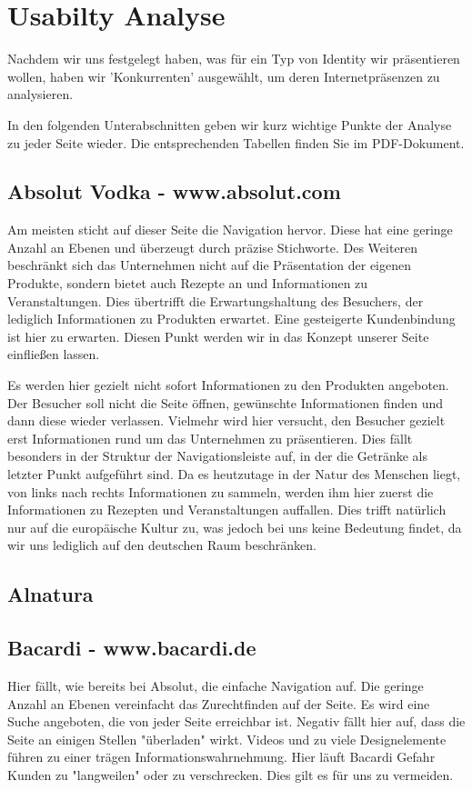 \documentclass[12pt,a4paper,oneside,ngerman]{article}
\begin{document}
\section{Usabilty Analyse} %
Nachdem wir uns festgelegt haben, was für ein Typ von Identity wir präsentieren wollen, haben wir 'Konkurrenten' ausgewählt, um deren Internetpräsenzen zu analysieren. 

In den folgenden Unterabschnitten geben wir kurz wichtige Punkte der Analyse zu jeder Seite wieder. Die entsprechenden Tabellen finden Sie im PDF-Dokument. %

\subsection{Absolut Vodka - www.absolut.com} %
Am meisten sticht auf dieser Seite die Navigation hervor. Diese hat eine geringe Anzahl an Ebenen und überzeugt durch präzise Stichworte. Des Weiteren beschränkt sich das Unternehmen nicht auf die Präsentation der eigenen Produkte, sondern bietet auch Rezepte an und Informationen zu Veranstaltungen. Dies übertrifft die Erwartungshaltung des Besuchers, der lediglich Informationen zu Produkten erwartet. Eine gesteigerte Kundenbindung ist hier zu erwarten. Diesen Punkt werden wir in das Konzept unserer Seite einfließen lassen.

Es werden hier gezielt nicht sofort Informationen zu den Produkten angeboten. Der Besucher soll nicht die Seite öffnen, gewünschte Informationen finden und dann diese wieder verlassen. Vielmehr wird hier versucht, den Besucher gezielt erst Informationen rund um das Unternehmen zu präsentieren. Dies fällt besonders in der Struktur der Navigationsleiste auf, in der die Getränke als letzter Punkt aufgeführt sind. Da es heutzutage in der Natur des Menschen liegt, von links nach rechts Informationen zu sammeln, werden ihm hier zuerst die Informationen zu Rezepten und Veranstaltungen auffallen. Dies trifft natürlich nur auf die europäische Kultur zu, was jedoch bei uns keine Bedeutung findet, da wir uns lediglich auf den deutschen Raum beschränken.

\subsection{Alnatura} %

\subsection{Bacardi - www.bacardi.de} %
Hier fällt, wie bereits bei Absolut, die einfache Navigation auf. Die geringe Anzahl an Ebenen vereinfacht das Zurechtfinden auf der Seite. Es wird eine Suche angeboten, die von jeder Seite erreichbar ist. Negativ fällt hier auf, dass die Seite an einigen Stellen "überladen" wirkt. Videos und zu viele Designelemente führen zu einer trägen Informationswahrnehmung. Hier läuft Bacardi Gefahr Kunden zu "langweilen" oder zu verschrecken. Dies gilt es für uns zu vermeiden.
\end{document}

